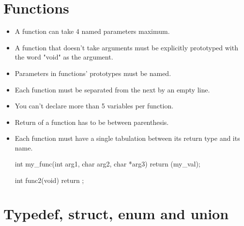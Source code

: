 \documentclass{42-ko}
\begin{document}
    \section{Functions}

        \begin{itemize}

            \item A function can take 4 named parameters maximum.

            \item A function that doesn't take arguments must be
                explicitly prototyped with the word "void" as the
                argument.

            \item Parameters in functions' prototypes must be named.

            \item Each function must be separated from the next by
                an empty line.

            \item You can't declare more than 5 variables per function.

            \item Return of a function has to be between parenthesis.

            \item Each function must have a single tabulation between its
                return type and its name.

            \begin{42ccode}
int my_func(int arg1, char arg2, char *arg3)
{
    return (my_val);
}

int func2(void)
{
    return ;
}
            \end{42ccode}

        \end{itemize}
        \newpage


    \section{Typedef, struct, enum and union}
\end{document}
